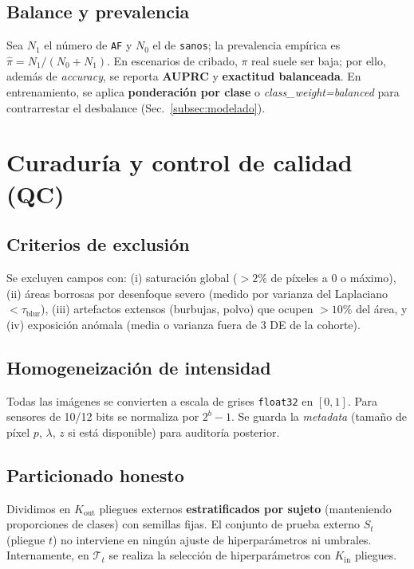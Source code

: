\subsection{Balance y prevalencia}
Sea $N_1$ el número de \texttt{AF} y $N_0$ el de \texttt{sanos}; la prevalencia empírica es $\hat{\pi}=N_1/(N_0+N_1)$. En escenarios de cribado, $\pi$ real suele ser baja; por ello, además de \emph{accuracy}, se reporta \textbf{AUPRC} y \textbf{exactitud balanceada}. En entrenamiento, se aplica \textbf{ponderación por clase} o \emph{class\_weight={balanced}} para contrarrestar el desbalance (Sec.~\ref{subsec:modelado}).

\section{Curaduría y control de calidad (QC)}
\subsection{Criterios de exclusión}
Se excluyen campos con: (i) saturación global ($>2\%$ de píxeles a 0 o máximo), (ii) áreas borrosas por desenfoque severo (medido por varianza del Laplaciano $<\tau_\mathrm{blur}$), (iii) artefactos extensos (burbujas, polvo) que ocupen $>10\%$ del área, y (iv) exposición anómala (media o varianza fuera de 3 DE de la cohorte).

\subsection{Homogeneización de intensidad}
Todas las imágenes se convierten a escala de grises \texttt{float32} en $[0,1]$. Para sensores de 10/12 bits se normaliza por $2^b-1$. Se guarda la \emph{metadata} (tamaño de píxel $p$, $\lambda$, $z$ si está disponible) para auditoría posterior.

\subsection{Particionado honesto}
Dividimos en $K_\text{out}$ pliegues externos \textbf{estratificados por sujeto} (manteniendo proporciones de clases) con semillas fijas. El conjunto de prueba externo $S_t$ (pliegue $t$) no interviene en ningún ajuste de hiperparámetros ni umbrales. Internamente, en $\mathcal{T}_t$ se realiza la selección de hiperparámetros con $K_\text{in}$ pliegues.

